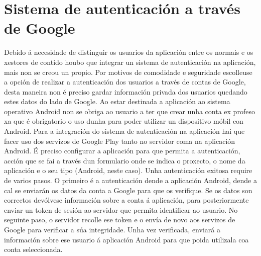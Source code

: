 \section{Sistema de autenticación a través de Google}
Debido á necesidade de distinguir os usuarios da aplicación entre os normais e os xestores de contido houbo que integrar un sistema de autenticación na aplicación, mais non se creou un propio.
Por motivos de comodidade e seguridade escolleuse a opción de realizar a autenticación dos usuarios a través de contas de Google, desta maneira non é preciso gardar información privada dos usuarios quedando estes datos do lado de Google. Ao estar destinada a aplicación ao sistema operativo Android non se obriga ao usuario a ter que crear unha conta ex profeso xa que é obrigatorio o uso dunha para poder utilizar un dispositivo móbil con Android.
Para a integración do sistema de autenticación na aplicación hai que facer uso dos servizos de Google Play tanto no servidor coma na aplicación Android. É preciso configurar a aplicación para que permita a autenticación, acción que se fai a través dun formulario onde se indica o proxecto, o nome da aplicación e o seu tipo (Android, neste caso).
Unha autenticación exitosa require de varios pasos. O primeiro é a autenticación dende a aplicación Android, dende a cal se enviarán os datos da conta a Google para que os verifique. Se os datos son correctos devólvese información sobre a conta á aplicación, para posteriormente enviar un token de sesión ao servidor que permita identificar ao usuario. No seguinte paso, o servidor recolle ese token e o envía de novo aos servizos de Google para verificar a súa integridade. Unha vez verificada, enviará a información sobre ese usuario á aplicación Android para que poida utilizala coa conta seleccionada.